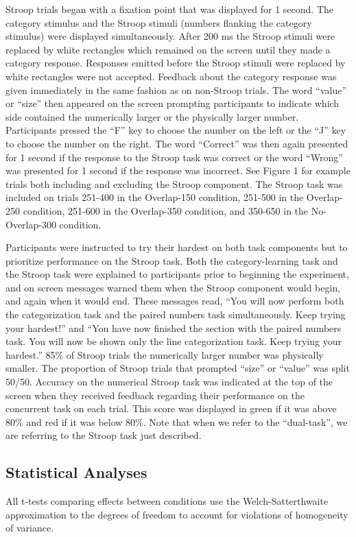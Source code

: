 \documentclass[apacite,draftfirst,jou]{apa6}
\begin{document}
Stroop trials began with a fixation point that was displayed for 1 second. The
category stimulus and the Stroop stimuli (numbers flanking the category
stimulus) were displayed simultaneously. After 200 ms the Stroop stimuli were
replaced by white rectangles which remained on the screen until they made a
category response. Responses emitted before the Stroop stimuli were replaced by
white rectangles were not accepted. Feedback about the category response was
given immediately in the same fashion as on non-Stroop trials. The word
``value'' or ``size'' then appeared on the screen prompting participants to
indicate which side contained the numerically larger or the physically larger
number. Participants pressed the ``F'' key to choose the number on the left or
the ``J'' key to choose the number on the right. The word ``Correct'' was then
again presented for 1 second if the response to the Stroop task was correct or
the word ``Wrong'' was presented for 1 second if the response was incorrect. See
Figure 1 for example trials both including and excluding the Stroop component.
The Stroop task was included on trials 251-400 in the Overlap-150 condition,
251-500 in the Overlap-250 condition, 251-600 in the Overlap-350 condition, and
350-650 in the No-Overlap-300 condition.

Participants were instructed to try their hardest on both task components but to
prioritize performance on the Stroop task. Both the category-learning task and
the Stroop task were explained to participants prior to beginning the
experiment, and on screen messages warned them when the Stroop component would
begin, and again when it would end. These messages read, ``You will now perform
both the categorization task and the paired numbers task simultaneously. Keep
trying your hardest!'' and ``You have now finished the section with the paired
numbers task. You will now be shown only the line categorization task. Keep
trying your hardest.'' 85\% of Stroop trials the numerically larger number was
physically smaller. The proportion of Stroop trials that prompted ``size'' or
``value'' was split 50/50. Accuracy on the numerical Stroop task was indicated
at the top of the screen when they received feedback regarding their performance
on the concurrent task on each trial. This score was displayed in green if it
was above 80\% and red if it was below 80\%. Note that when we refer to the
``dual-task'', we are referring to the Stroop task just described.

\subsection*{Statistical Analyses}
All t-tests comparing effects between conditions use the Welch-Satterthwaite
approximation to the degrees of freedom to account for violations of homogeneity
of variance.
\end{document}
